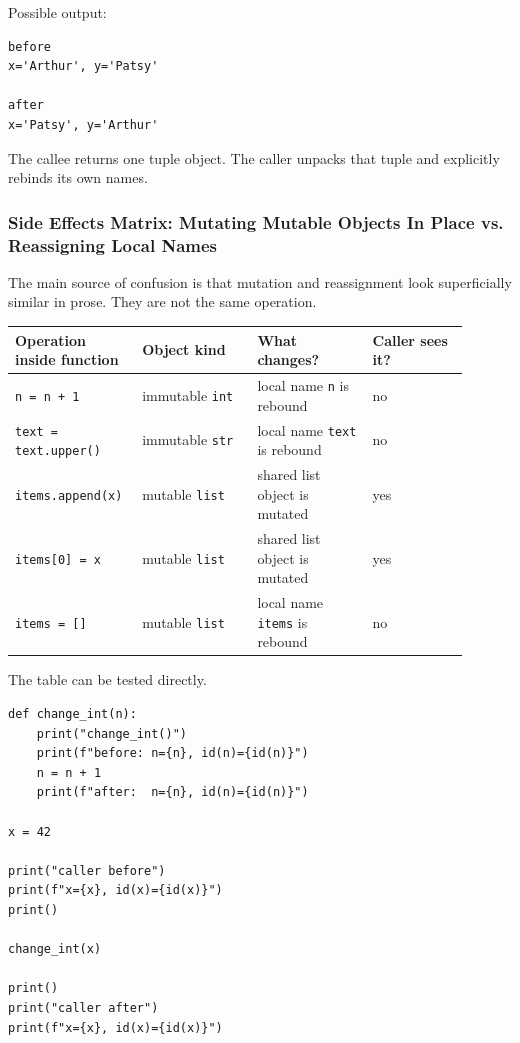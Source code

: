 Possible output:

\begin{verbatim}
before
x='Arthur', y='Patsy'

after
x='Patsy', y='Arthur'
\end{verbatim}

The callee returns one tuple object. The caller unpacks that tuple and explicitly rebinds its own names.

\subsubsection{Side Effects Matrix: Mutating Mutable Objects In Place vs. Reassigning Local Names}

The main source of confusion is that mutation and reassignment look superficially similar in prose. They are not the same operation.

\begin{center}
\begin{tabular}{|p{0.22\linewidth}|p{0.24\linewidth}|p{0.24\linewidth}|p{0.20\linewidth}|}
\hline
\textbf{Operation inside function} & \textbf{Object kind} & \textbf{What changes?} & \textbf{Caller sees it?} \\
\hline
\texttt{n = n + 1} & immutable \texttt{int} & local name \texttt{n} is rebound & no \\
\hline
\texttt{text = text.upper()} & immutable \texttt{str} & local name \texttt{text} is rebound & no \\
\hline
\texttt{items.append(x)} & mutable \texttt{list} & shared list object is mutated & yes \\
\hline
\texttt{items[0] = x} & mutable \texttt{list} & shared list object is mutated & yes \\
\hline
\texttt{items = []} & mutable \texttt{list} & local name \texttt{items} is rebound & no \\
\hline
\end{tabular}
\end{center}

The table can be tested directly.

\begin{verbatim}
def change_int(n):
    print("change_int()")
    print(f"before: n={n}, id(n)={id(n)}")
    n = n + 1
    print(f"after:  n={n}, id(n)={id(n)}")

x = 42

print("caller before")
print(f"x={x}, id(x)={id(x)}")
print()

change_int(x)

print()
print("caller after")
print(f"x={x}, id(x)={id(x)}")
\end{verbatim}

